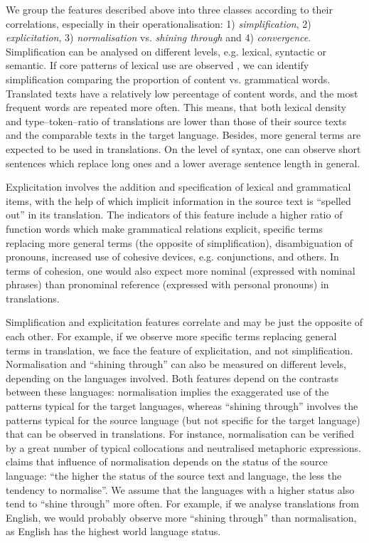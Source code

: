 \documentclass[output=paper]{LSP/langsci}
\begin{document}
We group the features described above into three classes according to their correlations, especially in their operationalisation: 1) \textit{simplification}, 2) \textit{explicitation}, 3) \textit{normalisation} vs. \textit{shining through} and 4) \textit{convergence}. Simplification can be analysed on different levels, e.g. lexical, syntactic or semantic. If core patterns of lexical use are observed \citep[see][]{Laviosa1998}, we can identify simplification comparing the proportion of content vs. grammatical words. Translated texts have a relatively low percentage of content words, and the most frequent words are repeated more often. This means, that both lexical density and type--token--ratio of translations are lower than those of their source texts and the comparable texts in the target language.  Besides, more general terms are expected to be used in translations. On the level of syntax, one can observe short sentences which replace long ones and a lower average sentence length in general.

Explicitation involves the addition and specification of lexical and grammatical items, with the help of which implicit information in the source text is “spelled out” in its translation.  The indicators of this feature include a higher ratio of function words which make grammatical relations explicit, specific terms replacing more general terms (the opposite of simplification), disambiguation of pronouns, increased use of cohesive devices, e.g. conjunctions, and others. In terms of cohesion, one would also expect more nominal (expressed with nominal phrases) than pronominal reference (expressed with personal pronouns) in translations.

Simplification and explicitation features correlate and may be just the opposite of each other.  For example, if we observe more specific terms replacing general terms in translation, we face the feature of explicitation, and not simplification. Normalisation and “shining through” can also be measured on different levels, depending on the languages involved. Both features depend on the contrasts between these languages: normalisation implies the exaggerated use of the patterns typical for the target languages, whereas “shining through” involves the patterns typical for the source language (but not specific for the target language) that can be observed in translations. For instance, normalisation can be verified by a great number of typical collocations and neutralised metaphoric expressions. \citet{Baker1996} claims that influence of normalisation depends on the status of the source language: “the higher the status of the source text and language, the less the tendency to normalise”. We assume that the languages with a higher status also tend to “shine through” more often. For example, if we analyse translations from English, we would probably observe more “shining through” than normalisation, as English has the highest world language status.
\end{document}
